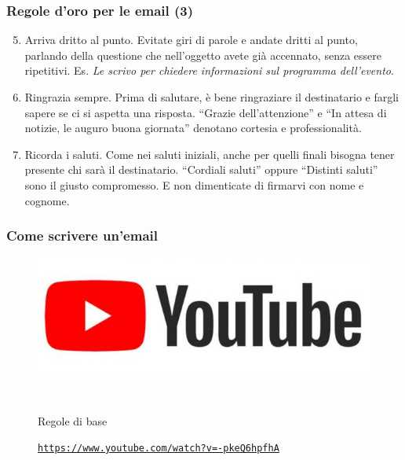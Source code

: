 \documentclass[handout]{beamer}
\begin{document}
\begin{frame}
\frametitle{Regole d'oro per le email (3)}
\begin{enumerate}\setcounter{enumi}{4}
  \item \alert{Arriva dritto al punto.} Evitate giri di parole e andate dritti al punto, parlando della questione che nell’oggetto avete già accennato, senza essere ripetitivi. Es. \emph{Le scrivo per chiedere informazioni sul programma dell’evento}.\pause
  \item \alert{Ringrazia sempre.} Prima di salutare, è bene ringraziare il destinatario e fargli sapere se ci si aspetta una risposta. ``Grazie dell’attenzione'' e ``In attesa di notizie, le auguro buona giornata'' denotano cortesia e professionalità.\pause
  \item \alert{Ricorda i saluti.} Come nei saluti iniziali, anche per quelli finali bisogna tener presente chi sarà il destinatario. ``Cordiali saluti'' oppure ``Distinti saluti'' sono il giusto compromesso. E non dimenticate di firmarvi con nome e cognome.
\end{enumerate}
\end{frame}





\begin{frame}
\frametitle{Come scrivere un'email}
\begin{figure}
  \includegraphics[width=.5\columnwidth]{img/ytlogo.jpg}
  
  ~
  
  Regole di base
  
  \href{https://www.youtube.com/watch?v=-pkeQ6hpfhA}{\texttt{https://www.youtube.com/watch?v=-pkeQ6hpfhA}}
\end{figure}
\end{frame}
\end{document}
